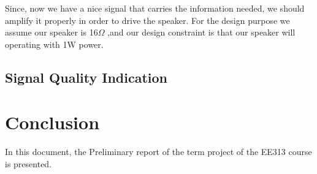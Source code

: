 \documentclass[a4paper,10pt]{article}
\begin{document}
Since, now we have a nice signal that carries the information needed, we should amplify it properly in order to drive the speaker. For the design purpose we assume our speaker is 16\(\Omega\) ,and our design constraint is that our speaker will operating with 1W power.
    
\subsection{Signal Quality Indication}

\section{Conclusion}
In this document, the Preliminary report of the term project of the EE313 course is presented. 
\end{document}
